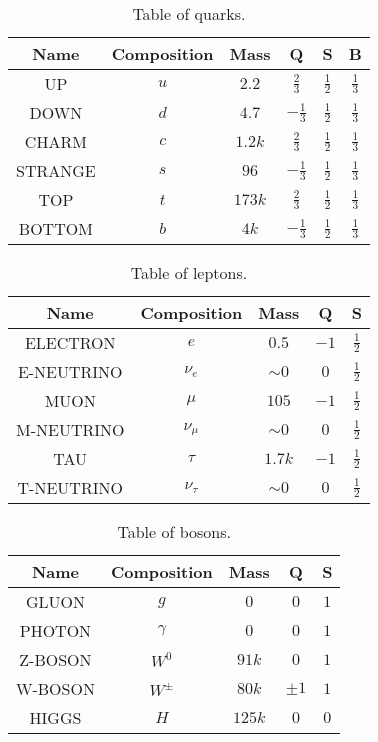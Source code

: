 \documentclass{article}
\begin{document}
\listoftables
\vspace{5pt}

\begin{table}[h!]
    \centering
    \begin{tabular}{||c c c c c c||} 
    \hline
    Name & Composition & Mass & Q & S & B \\ [0.5ex] 
    \hline\hline
    UP & $u$ & $2.2$ & $\frac{2}{3}$ & $\frac{1}{2}$ & $\frac{1}{3}$\\[1ex] 
    DOWN & $d$ & $4.7$ & $-\frac{1}{3}$ & $\frac{1}{2}$ & $\frac{1}{3}$\\[1ex]
    CHARM & $c$ & $1.2k$ & $\frac{2}{3}$ & $\frac{1}{2}$ & $\frac{1}{3}$\\[1ex]
    STRANGE & $s$ & $96$ & $-\frac{1}{3}$ & $\frac{1}{2}$ & $\frac{1}{3}$\\[1ex]
    TOP & $t$ & $173k$ & $\frac{2}{3}$ & $\frac{1}{2}$ & $\frac{1}{3}$\\[1ex]
    BOTTOM & $b$ & $4k$ & $-\frac{1}{3}$ & $\frac{1}{2}$ & $\frac{1}{3}$\\[1ex]
    \hline
    \end{tabular}
    \caption{Table of quarks.}
    \label{table:quarks}
\end{table}

\begin{table}[h!]
    \centering
    \begin{tabular}{||c c c c c ||} 
     \hline
     Name & Composition & Mass & Q & S \\ [0.5ex] 
     \hline\hline
     ELECTRON & $e$ & $0.5$ & $-1$ & $\frac{1}{2}$ \\[1ex] 
     E-NEUTRINO & $\nu_e$ & $\sim 0$ & $0$ & $\frac{1}{2}$ \\[1ex]
     MUON & $\mu$ & $105$ & $-1$ & $\frac{1}{2}$ \\[1ex]
     M-NEUTRINO & $\nu_\mu$ & $\sim 0$ & $0$ & $\frac{1}{2}$ \\[1ex]
     TAU & $\tau$ & $1.7k$ & $-1$ & $\frac{1}{2}$ \\[1ex]
     T-NEUTRINO & $\nu_\tau$ & $\sim 0$ & $0$ & $\frac{1}{2}$ \\[1ex]
     \hline
    \end{tabular}
    \caption{Table of leptons.}
    \label{table:leptons}
\end{table}

\begin{table}[h!]
    \centering
    \begin{tabular}{||c c c c c||} 
     \hline
     Name & Composition & Mass & Q & S \\ [0.5ex] 
     \hline\hline
     GLUON & $g$ & $0$ & $0$ & $1$ \\[1ex] 
     PHOTON & $\gamma$ & $0$ & $0$ & $1$ \\[1ex]
     Z-BOSON & $W^0$ & $91k$ & $0$ & $1$ \\[1ex]
     W-BOSON & $W^\pm$ & $80k$ & $\pm 1$ & $1$ \\[1ex]
     HIGGS & $H$ & $125k$ & $0$ & $0$ \\[1ex]
     \hline
    \end{tabular}
    \caption{Table of bosons.}
    \label{table:bosons}
\end{table}
\end{document}
